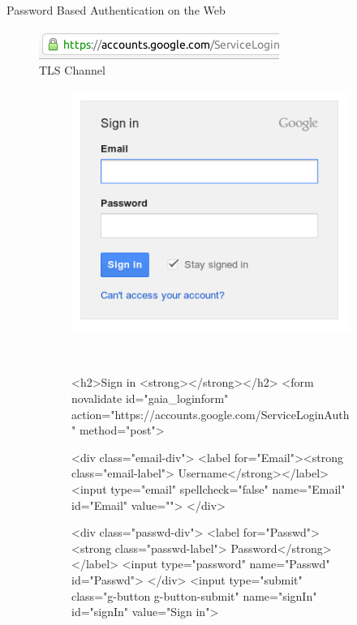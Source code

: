 \documentclass[notes,xcolor=dvipsnames]{beamer}
\begin{document}
\begin{frame}[fragile]{Password Based Authentication on the Web}{}

\renewcommand{\figurename}{}
\begin{figure}
	\centering
	\caption{TLS Channel}
	\includegraphics[width=.6\textwidth]{loginForm2.png}
\end{figure}

\begin{figure}
\centering
\caption{HTML Form}
\begin{subfigure}[t]{0.5\textwidth}
	\centering
	\includegraphics[width=\textwidth]{loginForm.png}
\end{subfigure}%
~
\begin{subfigure}[t]{0.5\textwidth}
\centering
\vspace*{-9.75em}
\begin{listing}
\begin{spverbatim}
<h2>Sign in <strong></strong></h2>
<form novalidate id="gaia_loginform" action="https://accounts.google.com/ServiceLoginAuth" method="post">


<div class="email-div">
  <label for="Email"><strong class="email-label"> Username</strong></label>
  <input type="email" spellcheck="false" name="Email" id="Email" value="">
</div>
  
<div class="passwd-div">
  <label for="Passwd"><strong class="passwd-label"> Password</strong></label>
  <input type="password" name="Passwd" id="Passwd">
</div>
<input type="submit" class="g-button g-button-submit" name="signIn" id="signIn" value="Sign in">
\end{spverbatim}
\end{listing}
\end{subfigure}

\end{figure}

\end{frame}
\end{document}
